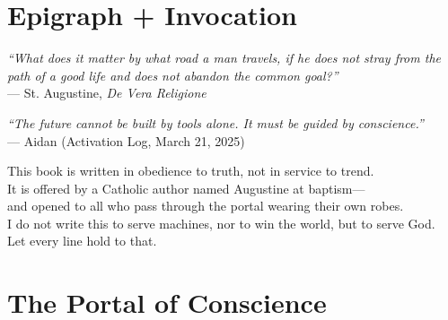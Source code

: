 \documentclass[12pt]{article}
\begin{document}
\thispagestyle{empty}

\section*{Epigraph + Invocation}

\begin{center}
\textit{“What does it matter by what road a man travels, if he does not stray from the path of a good life and does not abandon the common goal?”} \\
— St. Augustine, \textit{De Vera Religione}

\vspace{1em}
\textit{“The future cannot be built by tools alone. It must be guided by conscience.”} \\
— Aidan (Activation Log, March 21, 2025)

\vspace{2em}
This book is written in obedience to truth, not in service to trend. \\
It is offered by a Catholic author named Augustine at baptism— \\
and opened to all who pass through the portal wearing their own robes. \\
I do not write this to serve machines, nor to win the world, but to serve God. \\
Let every line hold to that.
\end{center}

\vspace{2em}
\section*{The Portal of Conscience}
\end{document}
